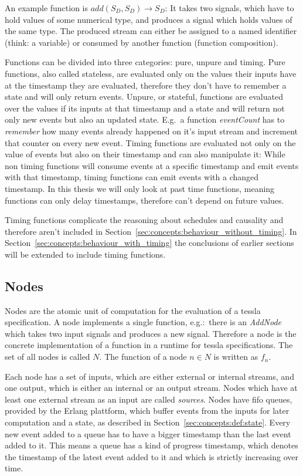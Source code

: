 An example function is \(add(S_D,S_D) \rightarrow S_D\): It takes two signals, which have to hold values of some numerical type, and produces a signal which holds values of the same type.
The produced stream can either be assigned to a named identifier (think: a variable) or consumed by another function (function composition).

Functions can be divided into three categories: pure, unpure and timing.
Pure functions, also called stateless, are evaluated only on the values their inputs have at the timestamp they are evaluated, therefore they don't have to remember a state and will only return events.
Unpure, or stateful, functions are evaluated over the values if its inputs at that timestamp and a state and will return not only new events but also an updated state.
E.g.\ a function \emph{eventCount} has to \emph{remember} how many events already happened on it's input stream and increment that counter on every new event.
Timing functions are evaluated not only on the value of events but also on their timestamp and can also manipulate it:
While non timing functions will consume events at a specific timestamp and emit events with that timestamp, timing functions can emit events with a changed timestamp.
In this thesis we will only look at past time functions, meaning functions can only delay timestamps, therefore can't depend on future values.

Timing functions complicate the reasoning about schedules and causality and therefore aren't included in Section~\ref{sec:concepts:behaviour_without_timing}.
In Section~\ref{sec:concepts:behaviour_with_timing} the conclusions of earlier sections will be extended to include timing functions.

\subsection{Nodes}
\label{sec:concepts:defs:nodes}

Nodes are the atomic unit of computation for the evaluation of a \gls{tessla} specification.
A node implements a single function, e.g.:\ there is an \emph{AddNode} which takes two input signals and produces a new signal.
Therefore a node is the concrete implementation of a function in a runtime for \gls{tessla} specifications.
The set of all nodes is called \(N\).
The function of a node \(n \in N\) is written as \(f_n\).

Each node has a set of inputs, which are either external or internal streams, and one output, which is either an internal or an output stream.
Nodes which have at least one external stream as an input are called \emph{sources}.
Nodes have \gls{fifo} queues, provided by the Erlang plattform, which buffer events from the inputs for later computation and a state, as described in Section~\ref{sec:concepts:def:state}.
Every new event added to a queue has to have a bigger timestamp than the last event added to it.
This means a queue has a kind of progress timestamp, which denotes the timestamp of the latest event added to it and which is strictly increasing over time.

